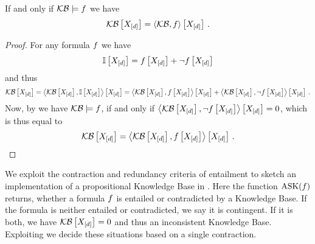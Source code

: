\begin{theorem}\label{the:ReduncancyOfEntailed}
	If and only if $\mathcal{KB}\models f$ we have
	\begin{align*}
		\mathcal{KB}\left[X_{[d]}\right]= \left\langle \mathcal{KB},f\right\rangle \left[ X_{[d]} \right]  \, . 
	\end{align*}
\end{theorem}
\begin{proof}
	For any formula $f$ we have
	\begin{align*}
		\mathbb{I}\left[X_{[d]}\right] = f\left[X_{[d]}\right] + \lnot f\left[X_{[d]}\right]
	\end{align*}
	and thus
	\begin{align*}
		\mathcal{KB}\left[X_{[d]}\right] 
		= \left\langle \mathcal{KB}\left[X_{[d]}\right],\mathbb{I}\left[X_{[d]}\right]\right\rangle \left[ X_{[d]} \right]
		= \left\langle \mathcal{KB}\left[X_{[d]}\right],f\left[X_{[d]}\right]\right\rangle \left[ X_{[d]} \right] +  \left\langle \mathcal{KB}\left[X_{[d]}\right],\lnot f\left[X_{[d]}\right]\right\rangle \left[ X_{[d]} \right] \, .
	\end{align*}
	Now, by  we have $\mathcal{KB}\models f$, if and only if $\left\langle \mathcal{KB}\left[X_{[d]}\right],\lnot f\left[X_{[d]}\right]\right\rangle \left[ X_{[d]} \right]=0$, which is thus equal to
	\begin{align*}
		\mathcal{KB}\left[X_{[d]}\right]
		= \left\langle \mathcal{KB}\left[X_{[d]}\right],f\left[X_{[d]}\right]\right\rangle \left[ X_{[d]} \right] \, .
	\end{align*}
\end{proof}




We exploit the contraction and redundancy criteria of entailment to sketch an implementation of a propositional Knowledge Base in .
Here the function $\mathrm{ASK}(f)$ returns, whether a formula $f$ is entailed or contradicted by a Knowledge Base.
If the formula is neither entailed or contradicted, we say it is contingent.
If it is both, we have $\mathcal{KB}\left[X_{[d]}\right]=0$ and thus an inconsistent Knowledge Base.
Exploiting  we decide these situations based on a single contraction.

